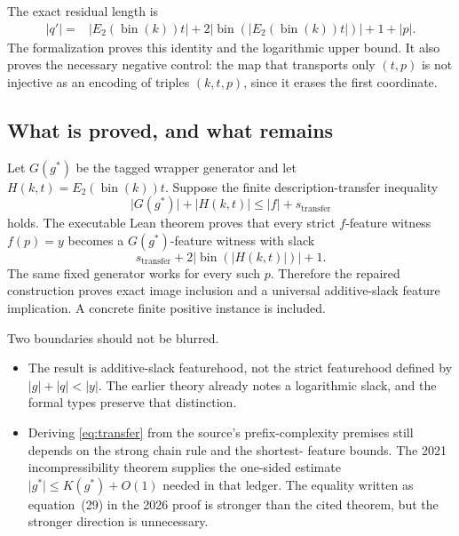 \documentclass[11pt]{article}
\newcommand{\bits}[1]{\lvert #1\rvert}
\newcommand{\K}{K}
\newcommand{\Etwo}{E_2}
\begin{document}
The exact residual length is
\begin{align}
  \bits{q'}={}&
  \bits{\Etwo(\operatorname{bin}(k))t}
  +2\bits{\operatorname{bin}
      (\bits{\Etwo(\operatorname{bin}(k))t})}+1
  +\bits p.
  \label{eq:qprimelength}
\end{align}
The formalization proves this identity and the logarithmic upper bound.  It
also proves the necessary negative control: the map that transports only
$(t,p)$ is not injective as an encoding of triples $(k,t,p)$, since it erases
the first coordinate.

\subsection{What is proved, and what remains}

Let $G(g^*)$ be the tagged wrapper generator and let
$H(k,t)=\Etwo(\operatorname{bin}(k))t$.  Suppose the finite
description-transfer inequality
\begin{equation}
  \bits{G(g^*)}+\bits{H(k,t)}
  \leq \bits f+s_{\mathrm{transfer}}
  \label{eq:transfer}
\end{equation}
holds.  The executable Lean theorem proves that every strict $f$-feature
witness $f(p)=y$ becomes a $G(g^*)$-feature witness with slack
\[
  s_{\mathrm{transfer}}
  +2\bits{\operatorname{bin}(\bits{H(k,t)})}+1.
\]
The same fixed generator works for every such $p$.  Therefore the repaired
construction proves exact image inclusion and a universal additive-slack
feature implication.  A concrete finite positive instance is included.

Two boundaries should not be blurred.

\begin{itemize}
  \item The result is additive-slack featurehood, not the strict featurehood
        defined by $\bits g+\bits q<\bits y$.  The earlier theory already
        notes a logarithmic slack, and the formal types preserve that
        distinction.
  \item Deriving \eqref{eq:transfer} from the source's prefix-complexity
        premises still depends on the strong chain rule and the shortest-
        feature bounds.  The 2021 incompressibility theorem supplies the
        one-sided estimate $\bits{g^*}\leq\K(g^*)+O(1)$ needed in that ledger.
        The equality written as equation~(29) in the 2026 proof is stronger
        than the cited theorem, but the stronger direction is unnecessary.
\end{itemize}
\end{document}
